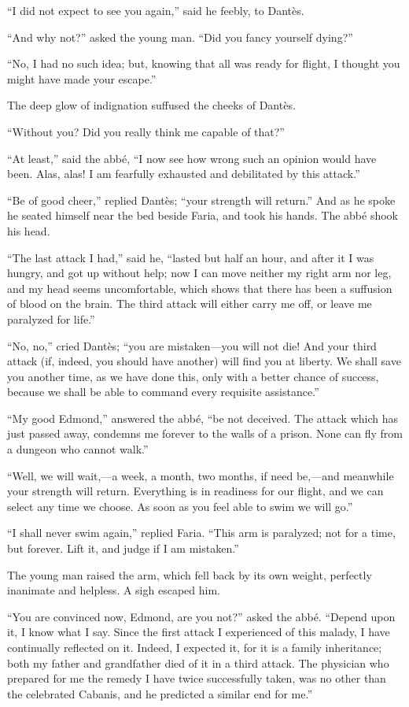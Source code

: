 “I did not expect to see you again,” said he feebly, to Dantès.

“And why not?” asked the young man. “Did you fancy yourself dying?”

“No, I had no such idea; but, knowing that all was ready for flight, I
thought you might have made your escape.”

The deep glow of indignation suffused the cheeks of Dantès.

“Without you? Did you really think me capable of that?”

“At least,” said the abbé, “I now see how wrong such an opinion would
have been. Alas, alas! I am fearfully exhausted and debilitated by this
attack.”

“Be of good cheer,” replied Dantès; “your strength will return.” And as
he spoke he seated himself near the bed beside Faria, and took his
hands. The abbé shook his head.

“The last attack I had,” said he, “lasted but half an hour, and after
it I was hungry, and got up without help; now I can move neither my
right arm nor leg, and my head seems uncomfortable, which shows that
there has been a suffusion of blood on the brain. The third attack will
either carry me off, or leave me paralyzed for life.”

“No, no,” cried Dantès; “you are mistaken—you will not die! And your
third attack (if, indeed, you should have another) will find you at
liberty. We shall save you another time, as we have done this, only
with a better chance of success, because we shall be able to command
every requisite assistance.”

“My good Edmond,” answered the abbé, “be not deceived. The attack which
has just passed away, condemns me forever to the walls of a prison.
None can fly from a dungeon who cannot walk.”

“Well, we will wait,—a week, a month, two months, if need be,—and
meanwhile your strength will return. Everything is in readiness for our
flight, and we can select any time we choose. As soon as you feel able
to swim we will go.”

“I shall never swim again,” replied Faria. “This arm is paralyzed; not
for a time, but forever. Lift it, and judge if I am mistaken.”

The young man raised the arm, which fell back by its own weight,
perfectly inanimate and helpless. A sigh escaped him.

“You are convinced now, Edmond, are you not?” asked the abbé. “Depend
upon it, I know what I say. Since the first attack I experienced of
this malady, I have continually reflected on it. Indeed, I expected it,
for it is a family inheritance; both my father and grandfather died of
it in a third attack. The physician who prepared for me the remedy I
have twice successfully taken, was no other than the celebrated
Cabanis, and he predicted a similar end for me.”

